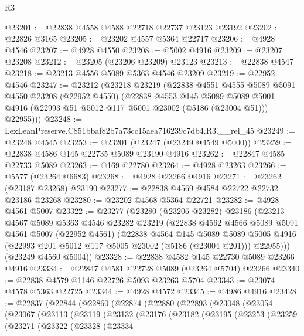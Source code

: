 \begin{lexlean}{R3}
\begin{coremodule}
@23201 := @22838 @4558 @4588 @22718 @22737 @23123 @23192
@23202 := @22826 @3165
@23205 := @23202 @4557 @5364 @22717
@23206 := @4928 @4546
@23207 := @4928 @4550
@23208 := @5002 @4916
@23209 := @23207 @23208
@23212 := @23205 (@23206 @23209) @23123
@23213 := @22838 @4547
@23218 := @23213 @4556 @5089 @5363 @4546 @23209
@23219 := @22952 @4546
@23247 := @23212
    (@23218
      @23219
      (@22838
        @4551
        @4555
        @5089
        @5091
        @4550
        @23208
        (@22952 @4550)
        (@22838
          @4553
          @145
          @5089
          @5089
          @5001
          @4916
          (@22993 @51 @5012 @117 @5001 @23002 (@5186 (@23004 @51)))
          @22955)))
@23248 := LexLeanPreserve.C851bbaf82b7a73cc15aea716239c7db4.R3.__rel_45
@23249 := @23248 @4545
@23253 := @23201 (@23247 (@23249 @4549 @5000))
@23259 := @22838 @4586 @145 @22735 @5089 @23190 @4916
@23262 := @22847 @4585 @22733 @5089
@23263 := @169 @22780
@23264 := @4928 @23263
@23266 := @5577 (@23264 @6683)
@23268 := @4928 @23266 @4916
@23271 := @23262 (@23187 @23268) @23190
@23277 := @22838 @4569 @4584 @22722 @22732 @23186 @23268
@23280 := @23202 @4568 @5364 @22721
@23282 := @4928 @4561 @5007
@23322 := @23277
    (@23280
      (@23206 @23282)
      @23186
      (@23213
        @4567
        @5089
        @5363
        @4546
        @23282
        @23219
        (@22838
          @4562
          @4566
          @5089
          @5091
          @4561
          @5007
          (@22952 @4561)
          (@22838
            @4564
            @145
            @5089
            @5089
            @5005
            @4916
            (@22993 @201 @5012 @117 @5005 @23002 (@5186 (@23004 @201)))
            @22955)))
      (@23249 @4560 @5004))
@23328 := @22838 @4582 @145 @22730 @5089 @23266 @4916
@23334 := @22847 @4581 @22728 @5089 (@23264 @5704) @23266
@23340 := @22838 @4579 @1146 @22726 @5093 @23263 @5704
@23343 := @23074 @4578 @5363 @22725
@23344 := @4928 @4572
@23345 := @4986 @4916
@23428 := @22837
    (@22844
      (@22860
        (@22874
          (@22880
            (@22893
              (@23048
                (@23054
                  (@23067
                    (@23113
                      (@23119
                        (@23132
                          (@23176
                            (@23182
                              (@23195
                                (@23253
                                  (@23259
                                    (@23271
                                      (@23322
                                        (@23328
                                          (@23334

\end{coremodule}
\end{lexlean}
